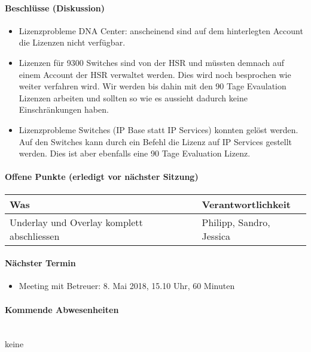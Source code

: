 \paragraph{Beschlüsse (Diskussion)}
\begin{itemize}	
	\item Lizenzprobleme DNA Center: anscheinend sind auf dem hinterlegten Account die Lizenzen nicht verfügbar.
	\item Lizenzen für 9300 Switches sind von der HSR und müssten demnach auf einem Account der HSR verwaltet werden. Dies wird noch besprochen wie weiter verfahren wird. Wir werden bis dahin mit den 90 Tage Evaulation Lizenzen arbeiten und sollten so wie es aussieht dadurch keine Einschränkungen haben.
	\item Lizenzprobleme Switches (IP Base statt IP Services) konnten gelöst werden. Auf den Switches kann durch ein Befehl die Lizenz auf IP Services gestellt werden. Dies ist aber ebenfalls eine 90 Tage Evaluation Lizenz.
\end{itemize}

\paragraph{Offene Punkte (erledigt vor nächster Sitzung)} \mbox{}

\begin{table}[H]
	\centering
	\begin{tabularx}{\textwidth}{X | p{4.5cm}}
		\rowcolor{gray!50}
		\textbf{Was} & \textbf{Verantwortlichkeit} \\
		\hline
		Underlay und Overlay komplett abschliessen & Philipp, Sandro, Jessica \\	
	\end{tabularx}
	\label{tab:my-label}
\end{table}

\paragraph{Nächster Termin}
\begin{itemize}	
	\item Meeting mit Betreuer: 8. Mai 2018, 15.10 Uhr, 60 Minuten
\end{itemize}

\paragraph{Kommende Abwesenheiten} \mbox{}\\
keine

